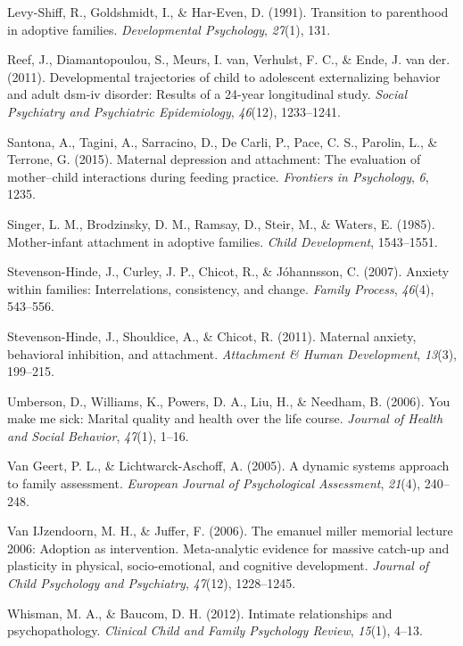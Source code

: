 \documentclass[man]{apa6}
\begin{document}
\leavevmode\hypertarget{ref-levy1991transition}{}%
Levy-Shiff, R., Goldshmidt, I., \& Har-Even, D. (1991). Transition to parenthood in adoptive families. \emph{Developmental Psychology}, \emph{27}(1), 131.

\leavevmode\hypertarget{ref-reef2011developmental}{}%
Reef, J., Diamantopoulou, S., Meurs, I. van, Verhulst, F. C., \& Ende, J. van der. (2011). Developmental trajectories of child to adolescent externalizing behavior and adult dsm-iv disorder: Results of a 24-year longitudinal study. \emph{Social Psychiatry and Psychiatric Epidemiology}, \emph{46}(12), 1233--1241.

\leavevmode\hypertarget{ref-santona2015maternal}{}%
Santona, A., Tagini, A., Sarracino, D., De Carli, P., Pace, C. S., Parolin, L., \& Terrone, G. (2015). Maternal depression and attachment: The evaluation of mother--child interactions during feeding practice. \emph{Frontiers in Psychology}, \emph{6}, 1235.

\leavevmode\hypertarget{ref-singer1985mother}{}%
Singer, L. M., Brodzinsky, D. M., Ramsay, D., Steir, M., \& Waters, E. (1985). Mother-infant attachment in adoptive families. \emph{Child Development}, 1543--1551.

\leavevmode\hypertarget{ref-stevenson2007anxiety}{}%
Stevenson-Hinde, J., Curley, J. P., Chicot, R., \& Jóhannsson, C. (2007). Anxiety within families: Interrelations, consistency, and change. \emph{Family Process}, \emph{46}(4), 543--556.

\leavevmode\hypertarget{ref-stevenson2011maternal}{}%
Stevenson-Hinde, J., Shouldice, A., \& Chicot, R. (2011). Maternal anxiety, behavioral inhibition, and attachment. \emph{Attachment \& Human Development}, \emph{13}(3), 199--215.

\leavevmode\hypertarget{ref-umberson2006you}{}%
Umberson, D., Williams, K., Powers, D. A., Liu, H., \& Needham, B. (2006). You make me sick: Marital quality and health over the life course. \emph{Journal of Health and Social Behavior}, \emph{47}(1), 1--16.

\leavevmode\hypertarget{ref-van2005dynamic}{}%
Van Geert, P. L., \& Lichtwarck-Aschoff, A. (2005). A dynamic systems approach to family assessment. \emph{European Journal of Psychological Assessment}, \emph{21}(4), 240--248.

\leavevmode\hypertarget{ref-van2006emanuel}{}%
Van IJzendoorn, M. H., \& Juffer, F. (2006). The emanuel miller memorial lecture 2006: Adoption as intervention. Meta-analytic evidence for massive catch-up and plasticity in physical, socio-emotional, and cognitive development. \emph{Journal of Child Psychology and Psychiatry}, \emph{47}(12), 1228--1245.

\leavevmode\hypertarget{ref-whisman2012intimate}{}%
Whisman, M. A., \& Baucom, D. H. (2012). Intimate relationships and psychopathology. \emph{Clinical Child and Family Psychology Review}, \emph{15}(1), 4--13.
\end{document}
